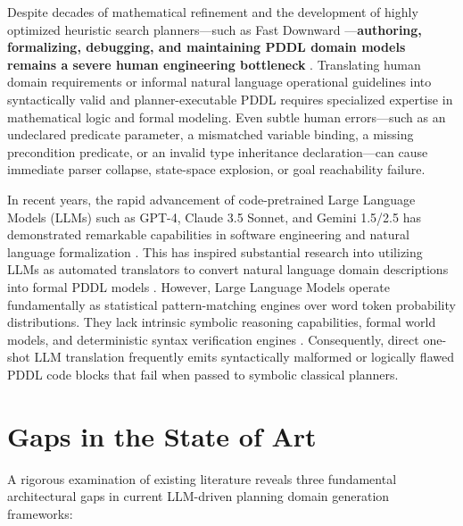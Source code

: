 \documentclass[11pt,a4paper]{report}
\begin{document}
Despite decades of mathematical refinement and the development of highly optimized heuristic search planners—such as Fast Downward \cite{helmert2006}—\textbf{authoring, formalizing, debugging, and maintaining PDDL domain models remains a severe human engineering bottleneck} \cite{georgievski2024}. Translating human domain requirements or informal natural language operational guidelines into syntactically valid and planner-executable PDDL requires specialized expertise in mathematical logic and formal modeling. Even subtle human errors—such as an undeclared predicate parameter, a mismatched variable binding, a missing precondition predicate, or an invalid type inheritance declaration—can cause immediate parser collapse, state-space explosion, or goal reachability failure.

In recent years, the rapid advancement of code-pretrained Large Language Models (LLMs) such as GPT-4, Claude 3.5 Sonnet, and Gemini 1.5/2.5 has demonstrated remarkable capabilities in software engineering and natural language formalization \cite{chen2021, oswald2024}. This has inspired substantial research into utilizing LLMs as automated translators to convert natural language domain descriptions into formal PDDL models \cite{valmeekam2023, kambhampati2024}. However, Large Language Models operate fundamentally as statistical pattern-matching engines over word token probability distributions. They lack intrinsic symbolic reasoning capabilities, formal world models, and deterministic syntax verification engines \cite{lin2023}. Consequently, direct one-shot LLM translation frequently emits syntactically malformed or logically flawed PDDL code blocks that fail when passed to symbolic classical planners.

\section{Gaps in the State of Art}
A rigorous examination of existing literature reveals three fundamental architectural gaps in current LLM-driven planning domain generation frameworks:
\end{document}
